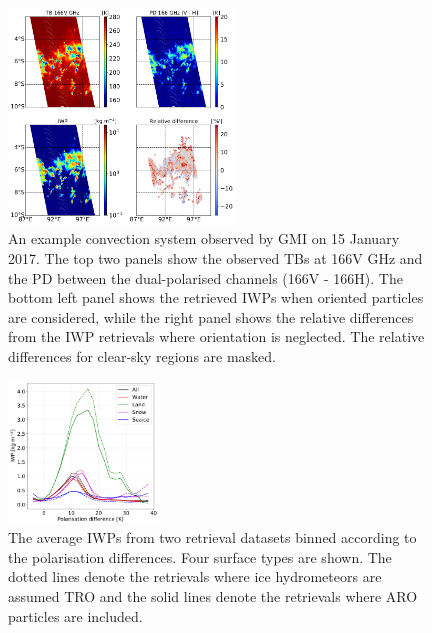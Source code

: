 \documentclass[amt, manuscript]{copernicus}
\begin{document}
\begin{figure}[t]
	\includegraphics[width=6cm]{Figures/example1_tropics_gmi.png}
	\caption{ An example convection system observed by GMI on 15 January 2017. The top two panels show the observed TBs at 166V\,\,GHz and the PD between the dual-polarised channels (166V - 166H). The bottom left panel shows the retrieved IWPs when oriented particles are considered, while the right panel shows the relative differences from the IWP retrievals where orientation is neglected. The relative differences for clear-sky regions are masked.}
	\label{fig:example1_GMI}
\end{figure}




\begin{figure}[t]
	\includegraphics[width=4cm]{Figures/IWP_PD_GMI.pdf}
	\caption{ The average IWPs  from two retrieval datasets binned according to the polarisation differences. Four surface types are shown. The dotted lines denote the retrievals where ice hydrometeors are assumed TRO and the solid lines denote the retrievals where ARO particles are included. }
	\label{fig:IWP_PD_GMI}
\end{figure}
\end{document}
